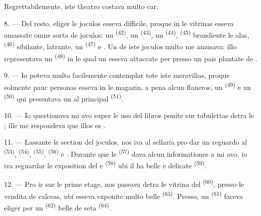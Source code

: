 Regrettabilemente, iste theatro costava multo car.

8. --- Del resto, eliger le joculos esseva difficile, proque in le vitrinas esseva
amassate omne sorta de joculos: un  \textsuperscript{(42)}, un
 \textsuperscript{(43)}, un 
\textsuperscript{(44)},  \textsuperscript{(45)} brandiente le
alas,  \textsuperscript{(46)} sibilante, 
latrante, un  \textsuperscript{(47)} e . Un de iste joculos multo me amusava: illo representava un
 \textsuperscript{(48)} in le qual un  esseva
attaccate per  presso un pais plantate de .


9. --- Io poteva multo facilemente contemplar tote iste meravilias, proque solmente
pauc personas esseva in le magazin, a pena alcun flaneros, un 
\textsuperscript{(49)} e un  \textsuperscript{(50)} qui
presentava un  al  principal \textsuperscript{(51)}.

10. --- Io questionava mi avo super le uso del libros ponite sur tabulettas detra
le ; ille me respondeva que illos es .

\VUsaut{3.6mm}
\VUsaut{2.8mm}

11. --- Lassante le section del joculos, nos iva al sellaria pro dar un reguardo
al  \textsuperscript{(53)}, 
\textsuperscript{(54)},  \textsuperscript{(55)},
 \textsuperscript{(56)} e .
Durante que le  \textsuperscript{(57)} dava alcun
informationes a mi avo, io iva reguardar le exposition del  e
 \textsuperscript{(58)} ubi il ha belle  e
delicate  \textsuperscript{(59)}.

12. --- Pro ir sur le prime etage, nos passava detra le vitrina del
 \textsuperscript{(60)}, presso le vendita de calceas, ubi
esseva exponite multo belle  \textsuperscript{(63)}. Presso, un
 \textsuperscript{(61)} faceva eliger per un 
\textsuperscript{(62)} belle  de seta \textsuperscript{(64)}.

